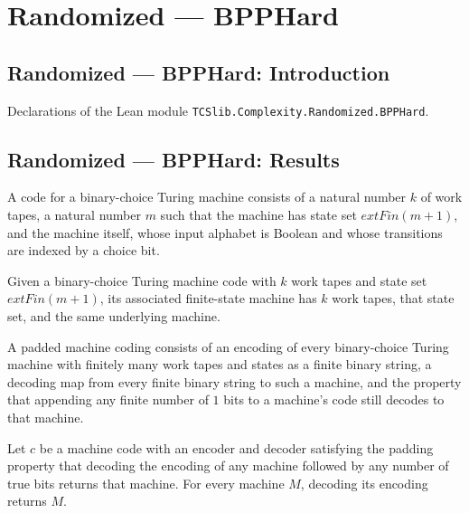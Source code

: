 \section{Randomized --- BPPHard}
\subsection*{Randomized --- BPPHard: Introduction}

Declarations of the Lean module \texttt{TCSlib.Complexity.Randomized.BPPHard}.

\subsection*{Randomized --- BPPHard: Results}

\begin{definition}
\label{Turing.CodePTM}
\leanok
{}
A code for a binary-choice Turing machine consists of a natural number $k$ of work
tapes, a natural number $m$ such that the machine has state set $	ext{Fin}(m+1)$, and
the machine itself, whose input alphabet is Boolean and whose transitions are indexed by
a choice bit.
\end{definition}

\begin{definition}
\label{Turing.CodePTM.toFinNDTM}
\leanok
{}
Given a binary-choice Turing machine code with $k$ work tapes and state set
$	ext{Fin}(m+1)$, its associated finite-state machine has $k$ work tapes, that state
set, and the same underlying machine.
\end{definition}

\begin{definition}
\label{Turing.PTMCode}
\leanok
{}
A padded machine coding consists of an encoding of every binary-choice Turing machine
with finitely many work tapes and states as a finite binary string, a decoding map from
every finite binary string to such a machine, and the property that appending any finite
number of $1$ bits to a machine's code still decodes to that machine.
\end{definition}

\begin{theorem}
\label{Turing.PTMCode.decode_encode}
\leanok
{}
Let $c$ be a machine code with an encoder and decoder satisfying the padding property
that decoding the encoding of any machine followed by any number of true bits returns
that machine. For every machine $M$, decoding its encoding returns $M$.
\end{theorem}

